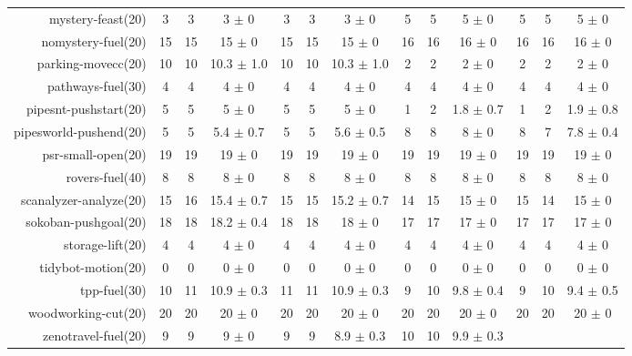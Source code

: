 \begin{center}
\begin{tabular}{|r|*{4}{ccc|}}
mystery-feast(20) & 3 & 3 & 3 \(\pm\) 0 & 3 & 3 & 3 \(\pm\) 0 & 5 & 5 & 5 \(\pm\) 0 & 5 & 5 & 5 \(\pm\) 0\\
nomystery-fuel(20) & 15 & 15 & 15 \(\pm\) 0 & 15 & 15 & 15 \(\pm\) 0 & 16 & 16 & 16 \(\pm\) 0 & 16 & 16 & 16 \(\pm\) 0\\
parking-movecc(20) & 10 & 10 & 10.3 \(\pm\) 1.0 & 10 & 10 & 10.3 \(\pm\) 1.0 & 2 & 2 & 2 \(\pm\) 0 & 2 & 2 & 2 \(\pm\) 0\\
pathways-fuel(30) & 4 & 4 & 4 \(\pm\) 0 & 4 & 4 & 4 \(\pm\) 0 & 4 & 4 & 4 \(\pm\) 0 & 4 & 4 & 4 \(\pm\) 0\\
pipesnt-pushstart(20) & 5 & 5 & 5 \(\pm\) 0 & 5 & 5 & 5 \(\pm\) 0 & 1 & 2 & 1.8 \(\pm\) 0.7 & 1 & 2 & 1.9 \(\pm\) 0.8\\
pipesworld-pushend(20) & 5 & 5 & 5.4 \(\pm\) 0.7 & 5 & 5 & 5.6 \(\pm\) 0.5 & 8 & 8 & 8 \(\pm\) 0 & 8 & 7 & 7.8 \(\pm\) 0.4\\
psr-small-open(20) & 19 & 19 & 19 \(\pm\) 0 & 19 & 19 & 19 \(\pm\) 0 & 19 & 19 & 19 \(\pm\) 0 & 19 & 19 & 19 \(\pm\) 0\\
rovers-fuel(40) & 8 & 8 & 8 \(\pm\) 0 & 8 & 8 & 8 \(\pm\) 0 & 8 & 8 & 8 \(\pm\) 0 & 8 & 8 & 8 \(\pm\) 0\\
scanalyzer-analyze(20) & 15 & 16 & 15.4 \(\pm\) 0.7 & 15 & 15 & 15.2 \(\pm\) 0.7 & 14 & 15 & 15 \(\pm\) 0 & 15 & 14 & 15 \(\pm\) 0\\
sokoban-pushgoal(20) & 18 & 18 & 18.2 \(\pm\) 0.4 & 18 & 18 & 18 \(\pm\) 0 & 17 & 17 & 17 \(\pm\) 0 & 17 & 17 & 17 \(\pm\) 0\\
storage-lift(20) & 4 & 4 & 4 \(\pm\) 0 & 4 & 4 & 4 \(\pm\) 0 & 4 & 4 & 4 \(\pm\) 0 & 4 & 4 & 4 \(\pm\) 0\\
tidybot-motion(20) & 0 & 0 & 0 \(\pm\) 0 & 0 & 0 & 0 \(\pm\) 0 & 0 & 0 & 0 \(\pm\) 0 & 0 & 0 & 0 \(\pm\) 0\\
tpp-fuel(30) & 10 & 11 & 10.9 \(\pm\) 0.3 & 11 & 11 & 10.9 \(\pm\) 0.3 & 9 & 10 & 9.8 \(\pm\) 0.4 & 9 & 10 & 9.4 \(\pm\) 0.5\\
woodworking-cut(20) & 20 & 20 & 20 \(\pm\) 0 & 20 & 20 & 20 \(\pm\) 0 & 20 & 20 & 20 \(\pm\) 0 & 20 & 20 & 20 \(\pm\) 0\\
zenotravel-fuel(20) & 9 & 9 & 9 \(\pm\) 0 & 9 & 9 & 8.9 \(\pm\) 0.3 & 10 & 10 & 9.9 \(\pm\) 0.3 &  &  & \\
\end{tabular}
\end{center}
